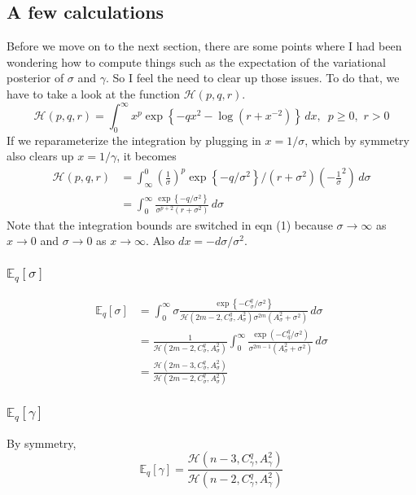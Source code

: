 \documentclass[11pt]{article}
\begin{document}
\subsection{A few calculations}
Before we move on to the next section, there are some points where I had been wondering how to compute things such as the expectation of the variational posterior of $\sigma$ and $\gamma$. So I feel the need to clear up those issues. To do that, we have to take a look at the function $\mathcal{H}\left(p,q,r\right)$.
$$
  \mathcal{H}\left(p,q,r\right) = \int_{0}^{\infty}x^{p} \exp \left\{-qx^{2}-\log \left(r +x^{-2}\right) \right\} \, dx, \,\,\, p \ge 0, \,\,r > 0
$$
If we reparameterize the integration by plugging in $x = 1/\sigma$, which by symmetry also clears up $x = 1/\gamma$, it becomes
\begin{align}
  \mathcal{H}\left(p, q, r \right) &= \int_{\infty}^{0} \left(\frac{1}{\sigma}\right)^{p} \exp \left\{-q/\sigma^{2} \right\}/\left(r+\sigma^{2}\right) \left(-\frac{1}{\sigma}^{2}\right)\, d\sigma\\
  &= \int_{0}^{\infty} \frac{\exp \left\{-q/\sigma^{2} \right\}}{\sigma^{p+2}\left(r+\sigma^{2}\right)}\, d\sigma
\end{align}
Note that the integration bounds are switched in eqn (1) because $\sigma \rightarrow \infty$ as $x \rightarrow 0$ and $\sigma \rightarrow 0$ as $x \rightarrow \infty$. Also $dx = -d\sigma/\sigma^{2}$.
\subsubsection{$\mathbb{E}_{q}\left[\sigma \right]$}
\begin{align*}
  \mathbb{E}_{q}\left[\sigma \right] &= \int_{0}^{\infty} \sigma \frac{\exp \left\{-C_{\sigma}^{q}/\sigma^{2} \right\}}{\mathcal{H}\left(2m-2,C_{\sigma}^{q},A_{\sigma}^{2}\right)\sigma^{2m}\left(A_{\sigma}^{2}+\sigma^{2}\right)}\, d\sigma\\
  &= \frac{1}{\mathcal{H}\left(2m-2,C_{\sigma}^{q}, A_{\sigma}^{2}\right)} \int_{0}^{\infty} \frac{\exp \left(-C_{q}^{q}/\sigma^{2}\right)}{\sigma^{2m-1}\left(A_{\sigma}^{2}+\sigma^{2}\right)}\, d\sigma \\
  &= \frac{\mathcal{H}\left(2m-3, C_{\sigma}^{q}, A_{\sigma}^{2}\right)}{\mathcal{H}\left(2m-2, C_{\sigma}^{q}, A_{\sigma}^{2}\right)}
\end{align*}
\subsubsection{$\mathbb{E}_{q}\left[\gamma\right]$}
By symmetry,
$$
  \mathbb{E}_{q}\left[\gamma\right] = \frac{\mathcal{H}\left(n-3, C_{\gamma}^{q}, A_{\gamma}^{2}\right)}{\mathcal{H}\left(n-2, C_{\gamma}^{q}, A_{\gamma}^{2}\right)}
$$
\end{document}
